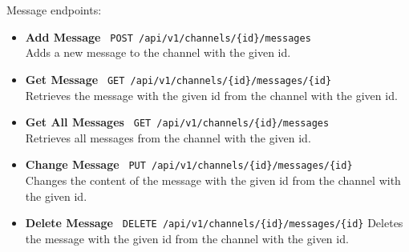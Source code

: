\documentclass[a4paper,12pt]{article}
\begin{document}
	Message endpoints:
	\begin{itemize}
		\item \textbf{Add Message} \texttt{ POST /api/v1/channels/\{id\}/messages } \\
		Adds a new message to the channel with the given id.
		\item \textbf{Get Message} \texttt{ GET /api/v1/channels/\{id\}/messages/\{id\} } \\
		Retrieves the message with the given id from the channel with the given id.
		\item \textbf{Get All Messages} \texttt{ GET /api/v1/channels/\{id\}/messages } \\
		Retrieves all messages from the channel with the given id.
		\item \textbf{Change Message} \texttt{ PUT /api/v1/channels/\{id\}/messages/\{id\} } \\
		Changes the content of the message with the given id from the channel with the given id.
		\item \textbf{Delete Message} \texttt{ DELETE /api/v1/channels/\{id\}/messages/\{id\}}
		Deletes the message with the given id from the channel with the given id.
	\end{itemize}


\end{document}
